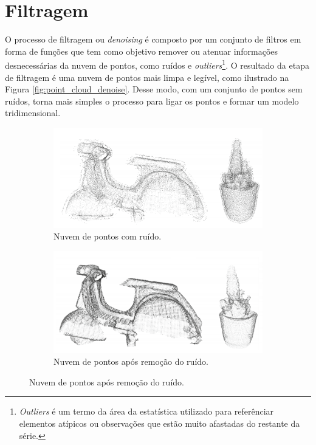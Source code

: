 \section{Filtragem}
\label{sec:filtragem}

O processo de filtragem ou \textit{denoising} é composto por um conjunto de filtros em forma de funções que tem como objetivo remover ou atenuar informações desnecessárias da nuvem de pontos, como ruídos e \textit{outliers}\footnote{\textit{Outliers} é um termo da área da estatística utilizado para referênciar elementos atípicos ou observações que estão muito afastadas do restante da série.}.
O resultado da etapa de filtragem é uma nuvem de pontos mais limpa e legível, como ilustrado na Figura \ref{fig:point_cloud_denoise}. 
Desse modo, com um conjunto de pontos sem ruídos, torna mais simples o processo para ligar os pontos e formar um modelo tridimensional.

\begin{figure}[H]
    \centering
    \caption{Remoção de ruído em uma nuvem de pontos.}
    \label{fig:point_cloud_denoise}
    \begin{subfigure}[t]{0.45\textwidth}
        \includegraphics[width=\textwidth]{dados/figuras/noised.png}
        \caption{Nuvem de pontos com ruído.}
    \end{subfigure}
    \hspace{3em}
    \begin{subfigure}[t]{0.45\textwidth}
        \includegraphics[width=\textwidth]{dados/figuras/denoised.png}
        \caption{Nuvem de pontos após remoção do ruído.}
    \end{subfigure}
\end{figure}

